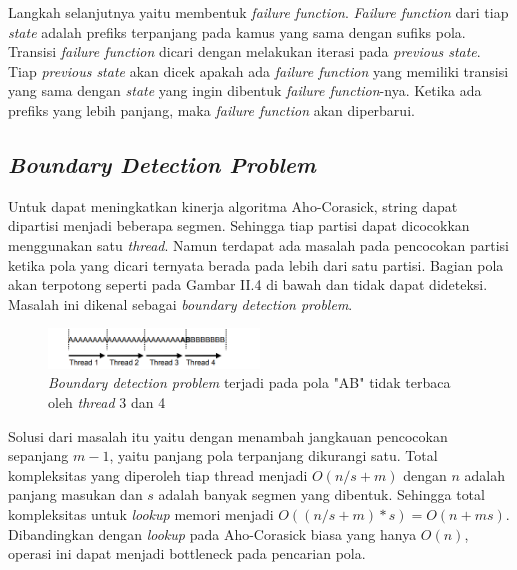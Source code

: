     Langkah selanjutnya yaitu membentuk \emph{failure function}. \emph{Failure function} dari tiap \emph{state} adalah prefiks terpanjang pada kamus yang sama dengan sufiks pola. Transisi \emph{failure function} dicari dengan melakukan iterasi pada \emph{previous state}. Tiap \emph{previous state} akan dicek apakah ada \emph{failure function} yang memiliki transisi yang sama dengan \emph{state} yang ingin dibentuk \emph{failure function}-nya. Ketika ada prefiks yang lebih panjang, maka \emph{failure function} akan diperbarui.
    
  \subsection {\emph{Boundary Detection Problem}}
    
    Untuk dapat meningkatkan kinerja algoritma Aho-Corasick, string dapat dipartisi menjadi beberapa segmen. Sehingga tiap partisi dapat dicocokkan menggunakan satu \emph{thread}. Namun terdapat ada masalah pada pencocokan partisi ketika pola yang dicari ternyata berada pada lebih dari satu partisi. Bagian pola akan terpotong seperti pada Gambar II.4 di bawah dan tidak dapat dideteksi. Masalah ini dikenal sebagai \emph{boundary detection problem}. 
    
    \begin{figure}[htb]
      \centering
      \includegraphics[width=0.5\textwidth]{resources/boundary.png}
      \caption[\emph{Boundary detection problem} terjadi pada pola "AB" tidak terbaca oleh \emph{thread} 3 dan 4]{\emph{Boundary detection problem} terjadi pada pola "AB" tidak terbaca oleh \emph{thread} 3 dan 4 \citep{lin2013}}
    \end{figure}
    
    Solusi dari masalah itu yaitu dengan menambah jangkauan pencocokan sepanjang $m - 1$, yaitu panjang pola terpanjang dikurangi satu. Total kompleksitas yang diperoleh tiap thread menjadi $O(n/s + m)$ dengan $n$ adalah panjang masukan dan $s$ adalah banyak segmen yang dibentuk. Sehingga total kompleksitas untuk \emph{lookup} memori menjadi $O((n/s + m) * s) = O(n + ms)$. Dibandingkan dengan \emph{lookup} pada Aho-Corasick biasa yang hanya $O(n)$, operasi ini dapat menjadi bottleneck pada pencarian pola.
    

